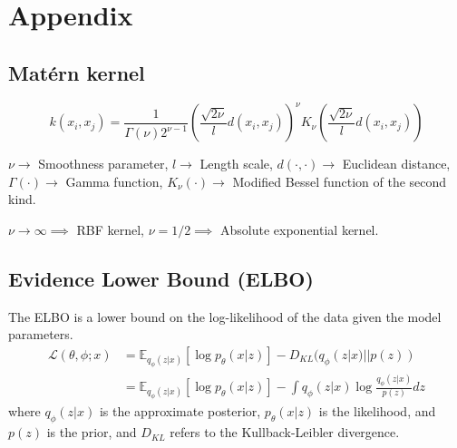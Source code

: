 \section{Appendix}\label{sec:appendix}

\subsection{Mat\'{e}rn kernel}\label{sec:matern-kernel}

\begin{equation}
    k(x_i, x_j)
    =
    \frac{1}{\Gamma(\nu) 2^{\nu - 1}} {\left( \frac{\sqrt{2\nu}}{l} d(x_i , x_j) \right)}^\nu K_\nu \left( \frac{\sqrt{2\nu}}{l} d(x_i , x_j) \right)
\end{equation}

\( \nu \to \) Smoothness parameter, \( l \to \) Length scale, \( d(\cdot, \cdot) \to \) Euclidean distance, \( \Gamma(\cdot) \to \) Gamma function, \( K_\nu(\cdot) \to \) Modified Bessel function of the second kind.

\( \nu \to \infty \implies \) RBF kernel, \( \nu = 1/2 \implies \) Absolute exponential kernel.

\subsection{Evidence Lower Bound (ELBO)}

The ELBO is a lower bound on the log-likelihood of the data given the model parameters.
\begin{equation}
    \begin{aligned}
        \mathcal{L}(\theta, \phi; x)
         & =
        \mathbb{E}_{q_\phi(z|x)} \left[ \log p_\theta(x|z) \right] - D_{KL}(q_\phi(z|x) || p(z))
        \\ & =
        \mathbb{E}_{q_\phi(z|x)}\left[\log p_\theta(x|z)\right] - \int q_\phi(z|x) \log \frac{q_\phi(z|x)}{p(z)} dz
    \end{aligned}
\end{equation}
where \(q_\phi(z|x)\) is the approximate posterior, \(p_\theta(x|z)\) is the likelihood, and \(p(z)\) is the prior, and \(D_{KL}\) refers to the Kullback-Leibler divergence.
